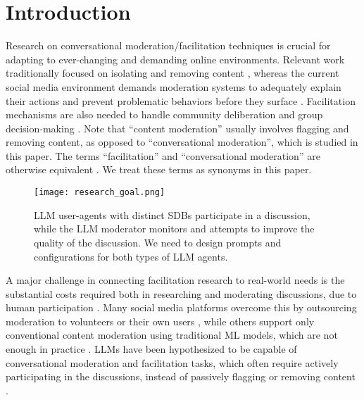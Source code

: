 %
\section{Introduction}
\label{sec:introduction}

Research on conversational moderation/facilitation techniques is crucial for adapting to ever-changing and demanding online environments. Relevant work traditionally focused on isolating and removing content \cite{seering_self_moderation, cresci_pesonalized_interventions}, whereas the current social media environment demands moderation systems to adequately explain their actions and prevent problematic behaviors before they surface \cite{cho-etal-2024-language, seering_self_moderation, cresci_pesonalized_interventions, make_reddit_great}.  Facilitation mechanisms are also needed to handle community deliberation and group decision-making \cite{kim_et_al_chatbot, seering_self_moderation}. Note that “content moderation” usually involves flagging and removing content, as opposed to “conversational moderation”, which is studied in this paper. The terms “facilitation” and “conversational moderation” are otherwise equivalent \cite{argyle2023, korre2025evaluation, falk-etal-2021-predicting}. We treat these terms as synonyms in this paper.

\begin{figure}[t]
	\centering
	\texttt{[image: research\_goal.png]}
	\caption{\ac{LLM} user-agents with distinct \acp{SDB} participate in a discussion, while the \ac{LLM} moderator monitors and attempts to improve the quality of the discussion. We need to design prompts and configurations for both types of \ac{LLM} agents.}
	\label{fig::goals}
\end{figure}


A major challenge in connecting facilitation research to real-world needs is    the substantial costs required both in researching and moderating discussions, due to human participation \cite{rossi_2024}. Many social media platforms overcome this by outsourcing moderation to volunteers or their own users \cite{Matias2019TheCL, schaffner_community_guidelines}, while others support only conventional content moderation using traditional \ac{ML} models, which are not enough in practice \cite{horta_automated_moderation, schaffner_community_guidelines}. \acfp{LLM} have been hypothesized to be capable of conversational moderation and facilitation tasks, which often require actively participating in the discussions, instead of passively flagging or removing content \cite{small-polis-llm, korre2025evaluation}. 

